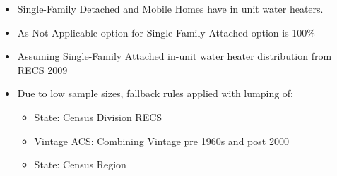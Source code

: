 \begin{itemize}
\item Single-Family Detached and Mobile Homes have in unit water heaters.
\item As Not Applicable option for Single-Family Attached option is 100\%
\item Assuming Single-Family Attached in-unit water heater distribution from RECS 2009
\item Due to low sample sizes, fallback rules applied with lumping of:
  \begin{itemize}
  \item State: Census Division RECS
  \item Vintage ACS: Combining Vintage pre 1960s and post 2000
  \item State: Census Region
  \end{itemize}
\end{itemize}
